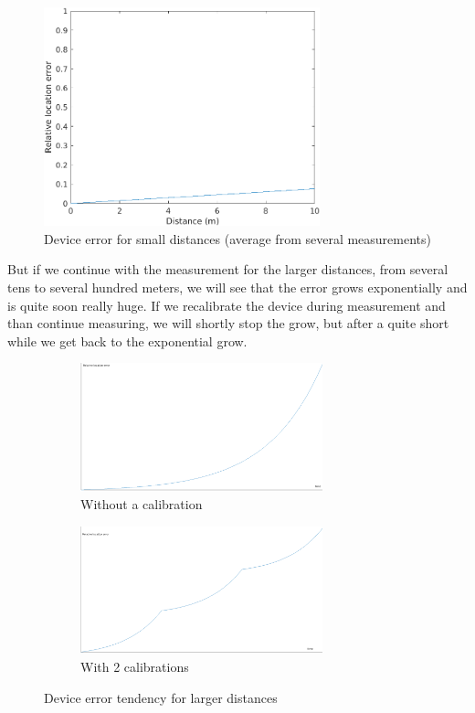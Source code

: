 \documentclass[hidelinks,a4paper]{article}
\begin{document}
\begin{figure}[h]
    \centering
    \includegraphics[width=8cm]{img/smallDistanceError.png}
    \caption{Device error for small distances (average from several measurements)}
\end{figure}

But if we continue with the measurement for the larger distances, from several tens to several hundred meters, we will see that the error grows exponentially and is quite soon really huge. If we recalibrate the device during measurement and than continue measuring, we will shortly stop the grow, but after a quite short while we get back to the exponential grow.\par
\clearpage
\begin{figure}[h]
  \begin{subfigure}{7.5cm}
    \includegraphics[width=7cm]{img/largeDistanceError.png}
    \caption{Without a calibration}
  \end{subfigure}
  \begin{subfigure}{7cm}
    \includegraphics[width=7cm]{img/calibrationError.png}
    \caption{With 2 calibrations}
  \end{subfigure}
  \caption[Caption for LOF]{Device error tendency for larger distances\footnotemark}
\end{figure}
\end{document}
